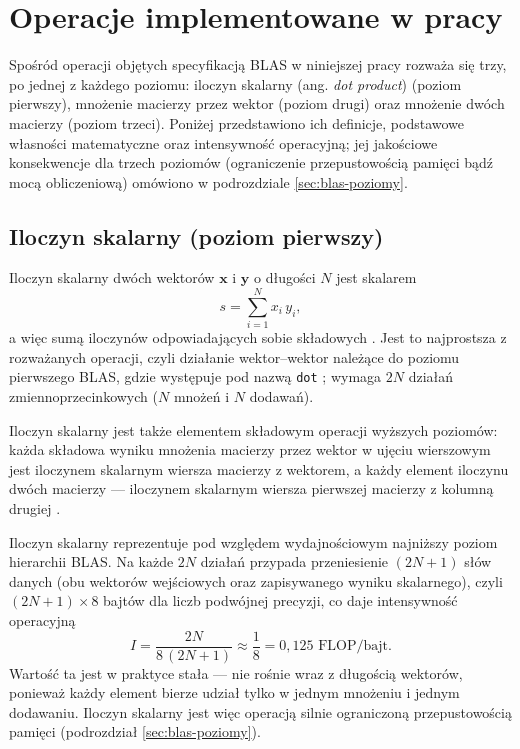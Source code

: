 \documentclass[a4paper,12pt]{book} %
\begin{document}
\section{Operacje implementowane w pracy}
\label{sec:blas-operacje}

Spośród operacji objętych specyfikacją BLAS w niniejszej pracy rozważa się trzy, po jednej z każdego poziomu: iloczyn skalarny (ang. \emph{dot product}) (poziom pierwszy), mnożenie macierzy przez wektor (poziom drugi) oraz mnożenie dwóch macierzy (poziom trzeci). Poniżej przedstawiono ich definicje, podstawowe własności matematyczne oraz intensywność operacyjną; jej jakościowe konsekwencje dla trzech poziomów (ograniczenie przepustowością pamięci bądź mocą obliczeniową) omówiono w podrozdziale \ref{sec:blas-poziomy}.

\subsection{Iloczyn skalarny (poziom pierwszy)}
\label{sec:op-dot}

Iloczyn skalarny dwóch wektorów $\mathbf{x}$ i $\mathbf{y}$ o długości $N$ jest skalarem
\[
  s = \sum_{i=1}^{N} x_i\, y_i,
\]
a więc sumą iloczynów odpowiadających sobie składowych \cite{lawson1979blas,golub2013matrix}. Jest to najprostsza z rozważanych operacji, czyli działanie wektor--wektor należące do poziomu pierwszego BLAS, gdzie występuje pod nazwą \texttt{dot} \cite{lawson1979blas}; wymaga $2N$ działań zmiennoprzecinkowych ($N$ mnożeń i $N$ dodawań).

Iloczyn skalarny jest także elementem składowym operacji wyższych poziomów: każda składowa wyniku mnożenia macierzy przez wektor w ujęciu wierszowym jest iloczynem skalarnym wiersza macierzy z wektorem, a każdy element iloczynu dwóch macierzy --- iloczynem skalarnym wiersza pierwszej macierzy z kolumną drugiej \cite{golub2013matrix}.

Iloczyn skalarny reprezentuje pod względem wydajnościowym najniższy poziom hierarchii BLAS. Na każde $2N$ działań przypada przeniesienie $(2N + 1)$ słów danych (obu wektorów wejściowych oraz zapisywanego wyniku skalarnego), czyli $(2N + 1)\times 8$ bajtów dla liczb podwójnej precyzji, co daje intensywność operacyjną
\[
  I = \frac{2N}{8\,(2N + 1)} \approx \frac{1}{8} = 0{,}125 \text{ FLOP/bajt}.
\]
Wartość ta jest w praktyce stała --- nie rośnie wraz z długością wektorów, ponieważ każdy element bierze udział tylko w jednym mnożeniu i jednym dodawaniu. Iloczyn skalarny jest więc operacją silnie ograniczoną przepustowością pamięci (podrozdział \ref{sec:blas-poziomy}).
\end{document}

